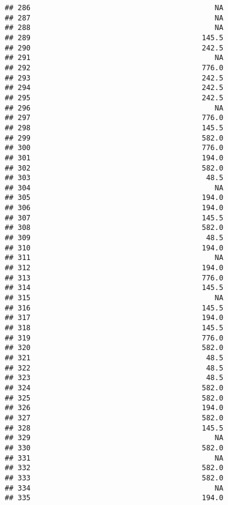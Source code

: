 \documentclass[
]{article}
\begin{document}
\begin{verbatim}
## 286                                           NA
## 287                                           NA
## 288                                           NA
## 289                                        145.5
## 290                                        242.5
## 291                                           NA
## 292                                        776.0
## 293                                        242.5
## 294                                        242.5
## 295                                        242.5
## 296                                           NA
## 297                                        776.0
## 298                                        145.5
## 299                                        582.0
## 300                                        776.0
## 301                                        194.0
## 302                                        582.0
## 303                                         48.5
## 304                                           NA
## 305                                        194.0
## 306                                        194.0
## 307                                        145.5
## 308                                        582.0
## 309                                         48.5
## 310                                        194.0
## 311                                           NA
## 312                                        194.0
## 313                                        776.0
## 314                                        145.5
## 315                                           NA
## 316                                        145.5
## 317                                        194.0
## 318                                        145.5
## 319                                        776.0
## 320                                        582.0
## 321                                         48.5
## 322                                         48.5
## 323                                         48.5
## 324                                        582.0
## 325                                        582.0
## 326                                        194.0
## 327                                        582.0
## 328                                        145.5
## 329                                           NA
## 330                                        582.0
## 331                                           NA
## 332                                        582.0
## 333                                        582.0
## 334                                           NA
## 335                                        194.0

\end{verbatim}
\end{document}
